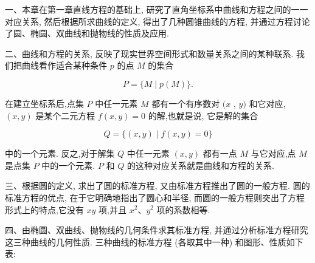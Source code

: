 \documentclass[lang=cn,newtx,10.5pt,scheme=chinese]{elegantbook}
\begin{document}
一、本章在第一章直线方程的基础上, 研究了直角坐标系中曲线和方程之间的一一对应关系, 然后根据所求曲线的定义, 得出了几种圆锥曲线的方程, 并通过方程讨论了圆、椭圆、双曲线和抛物线的性质及应用.

二、曲线和方程的关系, 反映了现实世界空间形式和数量关系之间的某种联系. 我们把曲线看作适合某种条件 \(p\) 的点 \(M\) 的集合

\[
  P = \{ M \mid p\left( M\right) \} .
\]

在建立坐标系后,点集 \(P\) 中任一元素 \(M\) 都有一个有序数对 \((x\) , \(y)\) 和它对应, \(\left( {x,y}\right)\) 是某个二元方程 \(f\left( {x,y}\right) = 0\) 的解,也就是说, 它是解的集合

\[
  Q = \{ \left( {x,y}\right) \mid f\left( {x,y}\right) = 0\}
\]

中的一个元素. 反之,对于解集 \(Q\) 中任一元素 \(\left( {x,y}\right)\) 都有一点 \(M\) 与它对应,点 \(M\) 是点集 \(P\) 中的一个元素. \(P\) 和 \(Q\) 的这种对应关系就是曲线和方程的关系.

三、根据圆的定义, 求出了圆的标准方程, 又由标准方程推出了圆的一般方程. 圆的标准方程的优点, 在于它明确地指出了圆心和半径, 而圆的一般方程则突出了方程形式上的特点,它没有 \({xy}\) 项,并且 \({x}^{2}\text{、}{y}^{2}\) 项的系数相等.

四、由椭圆、双曲线、抛物线的几何条件求其标准方程, 并通过分析标准方程研究这三种曲线的几何性质. 三种曲线的标准方程 (各取其中一种) 和图形、性质如下表:
\end{document}
